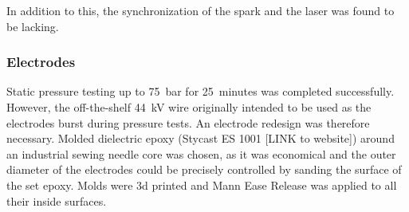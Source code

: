             In addition to this, the synchronization of the spark and the laser was found to be lacking.

        \subsubsection{Electrodes}
            Static pressure testing up to \qty{75}{bar} for \qty{25}{minutes} was completed successfully. However, the off-the-shelf \qty{44}{kV} wire originally intended to be used as the electrodes burst during pressure tests. An electrode redesign was therefore necessary. Molded dielectric epoxy (Stycast ES 1001 [LINK to website]) around an industrial sewing needle core was chosen, as it was economical and the outer diameter of the electrodes could be precisely controlled by sanding the surface of the set epoxy. Molds were 3d printed and Mann Ease Release was applied to all their inside surfaces.

